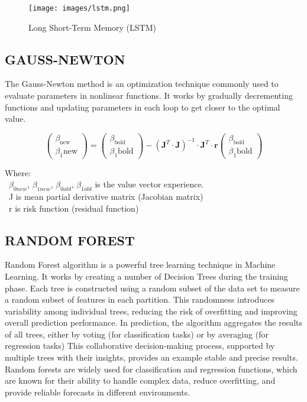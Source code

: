 \documentclass{ieeeojies}
\begin{document}
\begin{figure}[H]
    \centering
    \begin{minipage}{0.3\textwidth}
    \centering
    \texttt{[image: images/lstm.png]}
    \caption{Long Short-Term Memory (LSTM)}
    \label{fig:1}
    \end{minipage}
\end{figure}

\subsection{GAUSS-NEWTON}
\indent The Gauss-Newton method is an optimization technique commonly used to evaluate parameters in nonlinear functions. It works by gradually decrementing functions and updating parameters in each loop to get closer to the optimal value.

\begin{equation}
    \left(\begin{array}{c}
    \beta_\text{new} \\
    \beta_1\text{new}
    \end{array}\right) = \left(\begin{array}{c}
    \beta_\text{bold} \\
    \beta_1\text{bold}
    \end{array}\right) - (\mathbf{J}^T\cdot\mathbf{J})^{-1}\cdot\mathbf{J}^T\cdot\mathbf{r}\left(\begin{array}{c}
    \beta_\text{bold} \\
    \beta_1\text{bold}
    \end{array}\right)
\end{equation}

Where:\\
	\indent\textbullet\ \(\beta_{0new},\, \beta_{1new},\, \beta_{0old},\, \beta_{1old}\) is the value vector experience.\\
	\indent\textbullet\ J is mean partial derivative matrix (Jacobian matrix)\\
        \indent\textbullet\ r is risk function (residual function)

\subsection{RANDOM FOREST}
\indent Random Forest \cite{b17} algorithm is a powerful tree learning technique in Machine Learning. It works by creating a number of Decision Trees during the training phase. Each tree is constructed using a random subset of the data set to measure a random subset of features in each partition. This randomness introduces variability among individual trees, reducing the risk of overfitting and improving overall prediction performance. In prediction, the algorithm aggregates the results of all trees, either by voting (for classification tasks) or by averaging (for regression tasks) This collaborative decision-making process, supported by multiple trees with their insights, provides an example stable and precise results. Random forests are widely used for classification and regression functions, which are known for their ability to handle complex data, reduce overfitting, and provide reliable forecasts in different environments.
\end{document}
